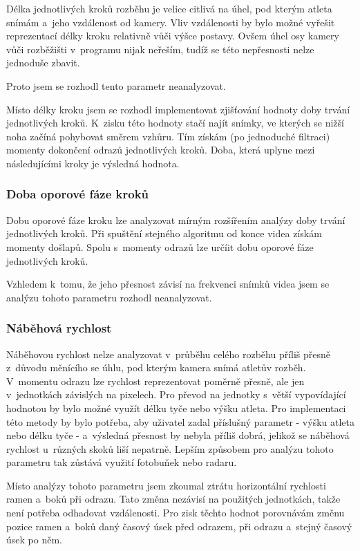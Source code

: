 Délka jednotlivých kroků rozběhu je velice citlivá na úhel, pod kterým atleta snímám a~jeho vzdálenost od kamery. Vliv vzdálenosti by bylo možné vyřešit reprezentací délky kroku relativně vůči výšce postavy. Ovšem úhel osy kamery vůči rozběžišti v~programu nijak neřeším, tudíž se této nepřesnosti nelze jednoduše zbavit.

Proto jsem se rozhodl tento parametr neanalyzovat.

Místo délky kroku jsem se rozhodl implementovat zjišťování hodnoty doby trvání jednotlivých kroků. K~zisku této hodnoty stačí najít snímky, ve kterých se nižší noha začíná pohybovat směrem vzhůru. Tím získám (po jednoduché filtraci) momenty dokončení odrazů jednotlivých kroků. Doba, která uplyne mezi následujícími kroky je výsledná hodnota.


\subsubsection{Doba oporové fáze kroků}

Dobu oporové fáze kroku lze analyzovat mírným rozšířením analýzy doby trvání jednotlivých kroků. Při spuštění stejného algoritmu od konce videa získám momenty došlapů. Spolu s~momenty odrazů lze určíit dobu oporové fáze jednotlivých kroků.

Vzhledem k~tomu, že jeho přesnost závisí na frekvenci snímků videa jsem se analýzu tohoto parametru rozhodl neanalyzovat.


\subsubsection{Náběhová rychlost}

Náběhovou rychlost nelze analyzovat v~průběhu celého rozběhu příliš přesně z~důvodu měnícího se úhlu, pod kterým kamera snímá atletův rozběh. V~momentu odrazu lze rychlost reprezentovat poměrně přesně, ale jen v~jednotkách závislých na pixelech. Pro převod na jednotky s~větší vypovídající hodnotou by bylo možné využít délku tyče nebo výšku atleta. Pro implementaci této metody by bylo potřeba, aby uživatel zadal příslušný parametr - výšku atleta nebo délku tyče - a~výsledná přesnost by nebyla příliš dobrá, jelikož se náběhová rychlost u~různých skoků liší nepatrně. Lepším způsobem pro analýzu tohoto parametru tak zůstává využití fotobuňek nebo radaru.

Místo analýzy tohoto parametru jsem zkoumal ztrátu horizontální rychlosti ramen a~boků při odrazu. Tato změna nezávisí na použitých jednotkách, takže není potřeba odhadovat vzdálenosti. Pro zisk těchto hodnot porovnávám změnu pozice ramen a~boků daný časový úsek před odrazem, při odrazu a~stejný časový úsek po něm.


